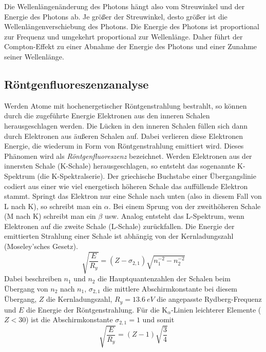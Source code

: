 \documentclass[ngerman]{scrartcl}
\begin{document}
Die Wellenlängenänderung des Photons hängt also vom Streuwinkel und der Energie des Photons ab. Je größer der Streuwinkel, desto größer ist die Wellenlängenverschiebung des Photons. Die Energie des Photons ist proportional zur Frequenz und umgekehrt proportional zur Wellenlänge. Daher führt der Compton-Effekt zu einer Abnahme der Energie des Photons und einer Zunahme seiner Wellenlänge.


\subsection[Röntgenfluoreszenzanalyse]{Röntgenfluoreszenzanalyse \cite{ref:angabe_roentgen}}
\label{subsec:grundlagen_roentgen}

Werden Atome mit hochenergetischer Röntgenstrahlung bestrahlt, so können durch die zugeführte
Energie Elektronen aus den inneren Schalen herausgeschlagen werden. Die Lücken in den inneren
Schalen füllen sich dann durch Elektronen aus äußeren Schalen auf. Dabei verlieren diese Elektronen
Energie, die wiederum in Form von Röntgenstrahlung emittiert wird. Dieses Phänomen wird als
\textit{Röntgenfluoreszenz} bezeichnet. Werden Elektronen aus der innersten Schale (K-Schale)
herausgeschlagen, so entsteht das sogenannte K-Spektrum (die K-Spektralserie). Der griechische Buchstabe
einer Übergangslinie codiert aus einer wie viel energetisch höheren Schale das auffüllende Elektron stammt.
Springt das Elektron nur eine Schale nach unten (also in diesem Fall von L nach K), so schreibt man ein $\alpha$.
Bei einem Sprung von der zweithöheren Schale (M nach K) schreibt man ein $\beta$ usw.
Analog entsteht das L-Spektrum,
wenn Elektronen auf die zweite Schale (L-Schale) zurückfallen. Die Energie der emittierten Strahlung einer
Schale ist abhängig von der Kernladungszahl (Moseley'sches Gesetz).
\begin{equation}
    \label{eq:moseley}
    \sqrt{\frac{E}{R_y}} = (Z-\sigma_{2,1})\sqrt{n_1^{-2}-n_2^{-2}}
\end{equation}
Dabei beschreiben $n_1$ und $n_2$ die Hauptquantenzahlen der Schalen beim Übergang von $n_2$ nach $n_1$, $\sigma_{2,1}$ die mittlere Abschirmkonstante bei diesem Übergang, $Z$ die Kernladungszahl, $R_y=\SI{13,6}{eV}$ die angepasste Rydberg-Frequenz und $E$ die Energie der Röntgenstrahlung. Für die K$_\alpha$-Linien leichterer Elemente ($Z<30$) ist die Abschirmkonstante $\sigma_{2,1}=1$ und somit
\begin{equation}
    \label{eq:moseley_einfach}
    \sqrt{\frac{E}{R_y}} = (Z-1)\sqrt{\frac{3}{4}}
\end{equation}
\end{document}
